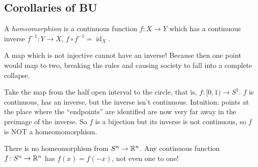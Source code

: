 \subsection{Corollaries of BU}
\begin{definition}[Homeomorphisms]
    A \emph{homeomorphism} is a continuous function $f \colon  X \to Y$ which has a continuous inverse $f^{-1} \colon  Y \to X$, $f\circ f^{-1}=\operatorname{id}_X$. 
\end{definition}
\begin{example}
    A map which is not injective cannot have an inverse! Because then one point would map to two, breaking the rules and causing society to fall into a complete collapse.
\end{example}
\begin{example}
    Take the map from the half open interval to the circle, that is, $f \colon [0,1) \to S^{1} $. $f$ is continuous, has an inverse, but the inverse isn't continuous. Intuition: points at the place where the ``endpoints'' are identified are now very far away in the preimage of the inverse. So $f$ is a bijection but its inverse is not continuous, so $f$ is NOT a homeomomorphism.
\end{example}
\begin{cor}
    There is no homeomorphism from $S^{n}\to \mathbb{R}^{n}$. Any continuous function $f \colon  S^{n} \to \mathbb{R}^{n}$ has $f(x)=f(-x)$, not even one to one!
\end{cor}
